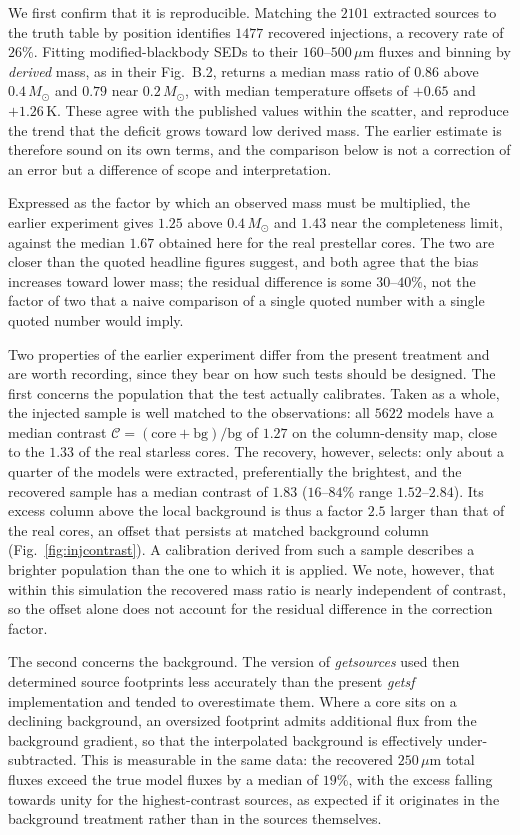 \documentclass[11pt,a4paper]{article}
\newcommand{\msun}{M_{\odot}}
\begin{document}
We first confirm that it is reproducible. Matching the $2101$ extracted
sources to the truth table by position identifies $1477$ recovered
injections, a recovery rate of $26\%$. Fitting modified-blackbody SEDs to
their $160$--$500\,\mu$m fluxes and binning by \emph{derived} mass, as in
their Fig.~B.2, returns a median mass ratio of $0.86$ above $0.4\,\msun$ and
$0.79$ near $0.2\,\msun$, with median temperature offsets of $+0.65$ and
$+1.26$\,K. These agree with the published values within the scatter, and
reproduce the trend that the deficit grows toward low derived mass. The
earlier estimate is therefore sound on its own terms, and the comparison
below is not a correction of an error but a difference of scope and
interpretation.

Expressed as the factor by which an observed mass must be multiplied, the
earlier experiment gives $1.25$ above $0.4\,\msun$ and $1.43$ near the
completeness limit, against the median $1.67$ obtained here for the real
prestellar cores. The two are closer than the quoted headline figures
suggest, and both agree that the bias increases toward lower mass; the
residual difference is some $30$--$40\%$, not the factor of two that a naive
comparison of a single quoted number with a single quoted number would imply.

Two properties of the earlier experiment differ from the present treatment
and are worth recording, since they bear on how such tests should be
designed. The first concerns the population that the test actually
calibrates. Taken as a whole, the injected sample is well matched to the
observations: all $5622$ models have a median contrast
$\mathcal{C}=(\mathrm{core}+\mathrm{bg})/\mathrm{bg}$ of $1.27$ on the
column-density map, close to the $1.33$ of the real starless cores. The
recovery, however, selects: only about a quarter of the models were
extracted, preferentially the brightest, and the recovered sample has a
median contrast of $1.83$ ($16$--$84\%$ range $1.52$--$2.84$). Its excess
column above the local background is thus a factor $2.5$ larger than that of
the real cores, an offset that persists at matched background column
(Fig.~\ref{fig:injcontrast}). A calibration derived from such a sample
describes a brighter population than the one to which it is applied. We note,
however, that within this simulation the recovered mass ratio is nearly
independent of contrast, so the offset alone does not account for the
residual difference in the correction factor.

The second concerns the background. The version of \emph{getsources} used
then determined source footprints less accurately than the present
\emph{getsf} implementation and tended to overestimate them. Where a core
sits on a declining background, an oversized footprint admits additional
flux from the background gradient, so that the interpolated background is
effectively under-subtracted. This is measurable in the same data: the
recovered $250\,\mu$m total fluxes exceed the true model fluxes by a median
of $19\%$, with the excess falling towards unity for the highest-contrast
sources, as expected if it originates in the background treatment rather
than in the sources themselves.
\end{document}
